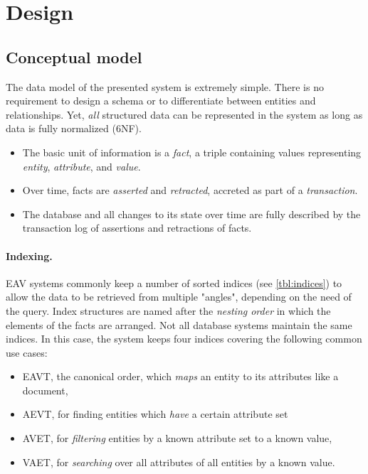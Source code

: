 \section{Design}\label{sec:design}






\subsection{Conceptual model}\label{sec:conceptual_model}

The data model of the presented system is extremely simple. There is no requirement to design a schema or to differentiate between entities and relationships. Yet, \emph{all} structured data can be represented in the system as long as data is fully normalized (6NF).

\begin{itemize}
  \item The basic unit of information is a \emph{fact}, a triple \lisp{[e a v]} containing values representing \emph{entity}, \emph{attribute}, and \emph{value}.

  \item Over time, facts are \emph{asserted} and \emph{retracted}, accreted as part of a \emph{transaction}.

  \item The database and all changes to its state over time are fully described by the transaction log of assertions and retractions of facts.
\end{itemize}

\paragraph{Indexing.}

EAV systems commonly keep a number of sorted indices (see \autoref{tbl:indices}) to allow the data to be retrieved from multiple "angles", depending on the need of the query. Index structures are named after the \emph{nesting order} in which the elements of the facts are arranged. Not all database systems maintain the same indices. In this case, the system keeps four indices covering the following common use cases:
\begin{itemize}
  \item EAVT, the canonical order, which \emph{maps} an entity to its attributes like a document,
  \item AEVT, for finding entities which \emph{have} a certain attribute set
  \item AVET, for \emph{filtering} entities by a known attribute set to a known value,
  \item VAET, for \emph{searching} over all attributes of all entities by a known value.
\end{itemize}


